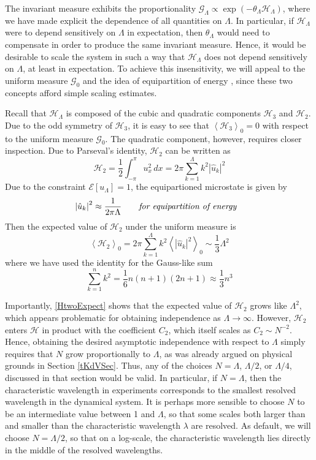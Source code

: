 \documentclass[11pt]{article}
\newcommand{\abs}[1]{\left| #1 \right|}
\newcommand{\mean}[1]{\left< #1 \right>}
\newcommand{\dx}{\, dx}
\newcommand{\lam}{\lambda}
\newcommand{\lamfac}{N}
\newcommand{\En}{\mathcal{E}}
\newcommand{\uhat}{\hat{u}}
\newcommand{\Ham}{\mathcal{H}}
\newcommand{\Hthree}{\Ham_{3}}
\newcommand{\Htwo}{\Ham_{2}}
\newcommand{\uL}{u_{\Lambda}}
\newcommand{\Gibbs}{\mathcal{G}}
\newcommand{\Gz}{\Gibbs_0}
\newcommand{\meanz}[1]{\mean{#1}_0}
\begin{document}
	The invariant measure exhibits the proportionality $ \Gibbs_{\Lambda} \propto \exp(-\theta_{\Lambda} \Ham_{\Lambda})$, where we have made explicit the dependence of all quantities on $\Lambda$. In particular, if $\Ham_{\Lambda}$ were to depend sensitively on $\Lambda$ in expectation, then $\theta_{\Lambda}$ would need to compensate in order to produce the same invariant measure. Hence, it would be desirable to scale the system in such a way that $\Ham_{\Lambda}$ does not depend sensitively on $\Lambda$, at least in expectation. 
To achieve this insensitivity, we will appeal to the uniform measure $\Gz$ and the idea of equipartition of energy \cite{abramov2003}, since these two concepts afford simple scaling estimates.

Recall that $\Ham_{\Lambda}$ is composed of the cubic and quadratic components $\Hthree$ and $\Htwo$. Due to the odd symmetry of $\Hthree$, it is easy to see that $\meanz{\Hthree} = 0$ with respect to the uniform measure $\Gz$. The quadratic component, however, requires closer inspection. Due to Parseval's identity, $\Htwo$ can be written as
\begin{equation}
\Htwo = \frac{1}{2} \int_{-\pi}^{\pi} u_x^2 \dx = 2 \pi \sum_{k=1}^{\Lambda} k^2 \abs{\uhat_k}^2
\end{equation}
Due to the constraint $\En[\uL] = 1$, the equipartioned microstate is given by 
\begin{align}
&\abs{\uhat_k}^2 \approx \frac{1}{2 \pi \Lambda}	 \qquad \mbox{\em for equipartition of energy}
\end{align}
Then the expected value of $\Htwo$ under the uniform measure is
\begin{equation}
\label{HtwoExpect}
\mean{\Htwo}_0 = 2 \pi \sum_{k=1}^{\Lambda} {k}^ 2 \mean{\abs{\uhat_k}^2}_0 \sim \frac{1}{3} \Lambda^2
\end{equation}
where we have used the identity for the Gauss-like sum
\begin{equation}
\sum_{k=1}^{n} {k}^ 2 = \frac{1}{6} n(n+1)(2n+1) \approx \frac{1}{3} n^3
\end{equation}

	Importantly, \eqref{HtwoExpect} shows that the expected value of $\Htwo$ grows like $\Lambda^2$, which appears problematic for obtaining independence as $\Lambda \to \infty$. However, $\Htwo$ enters $\Ham$ in product with the coefficient $C_2$, which itself scales as $C_2 \sim \lamfac^{-2}$. Hence, obtaining the desired asymptotic independence with respect to $\Lambda$ simply requires that $\lamfac$ grow proportionally to $\Lambda$, as was already argued on physical grounds in Section \ref{tKdVSec}. 
Thus, any of the choices $\lamfac = \Lambda$, $\Lambda/2$, or $\Lambda/4$, discussed in that section would be valid. In particular, if $\lamfac = \Lambda$, then the characteristic wavelength in experiments corresponds to the smallest resolved wavelength in the dynamical system. It is perhaps more sensible to choose $\lamfac$ to be an intermediate value between 1 and $\Lambda$, so that some scales both larger than and smaller than the characteristic wavelength $\lam$ are resolved. As default, we will choose $\lamfac = \Lambda/2$, so that on a log-scale, the characteristic wavelength lies directly in the middle of the resolved wavelengths. 
\end{document}
